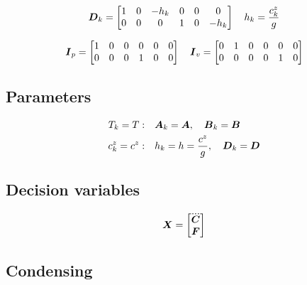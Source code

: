 \begin{equation*}
\mbox{\boldmath $D$}_{k} = 
\begin{bmatrix}
    1       & 0     & -h_k      & 0 & 0 & 0\\
    0 & 0 & 0                   & 1       & 0     & -h_k  \\
\end{bmatrix}
\quad
h_k = \frac{c^z_k}{g}
\end{equation*}

\begin{equation*}
\mbox{\boldmath $I$}_{p} = 
\begin{bmatrix} 
    1 & 0 & 0 & 0 & 0 & 0 \\
    0 & 0 & 0 & 1 & 0 & 0 
\end{bmatrix}
\quad
\mbox{\boldmath $I$}_{v} = 
\begin{bmatrix} 
    0 & 1 & 0 & 0 & 0 & 0 \\
    0 & 0 & 0 & 0 & 1 & 0 
\end{bmatrix}
\end{equation*}


\subsection{Parameters}
\begin{align*}
T_k = T:&
\quad
\mbox{\boldmath $A$}_k = \mbox{\boldmath $A$},
\quad
\mbox{\boldmath $B$}_k = \mbox{\boldmath $B$}\\
c^z_k = c^z:& 
\quad
h_k = h = \frac{c^z}{g},
\quad
\mbox{\boldmath $D$}_k = \mbox{\boldmath $D$}
\end{align*}


\subsection{Decision variables}
\begin{equation*}
\V{X} = 
\begin{bmatrix} 
    \cJerk \\ 
    \FD
\end{bmatrix}
\end{equation*}



\subsection{Condensing}

